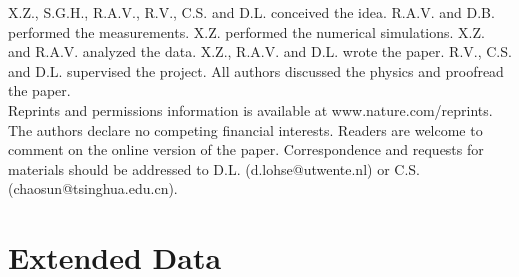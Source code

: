 \documentclass[aps,prl,superscriptaddress,preprint]{revtex4}
\newcommand{\blue}[1]{{\textcolor{blue}{#1}}}
\newcommand{\annotation}[1]{\blue{[\textit{#1}]}}
\begin{document}
X.Z., S.G.H., R.A.V., R.V., C.S. and D.L. conceived the idea.
R.A.V. and D.B. performed the measurements. X.Z. performed the numerical simulations. X.Z. and R.A.V. analyzed the data. 
X.Z., R.A.V. and D.L. wrote the paper. 
R.V., C.S. and D.L. supervised the project. 
 All authors discussed the physics and proofread the paper. \\

Reprints and permissions information is available at
www.nature.com/reprints. The authors declare no competing financial
interests. Readers are welcome to comment on the online version of the paper. 
Correspondence and requests for materials should be addressed to
D.L. (d.lohse@utwente.nl) or C.S. (chaosun@tsinghua.edu.cn).




 

\newpage
\iffalse
\section{Extended Data}
\end{document}
